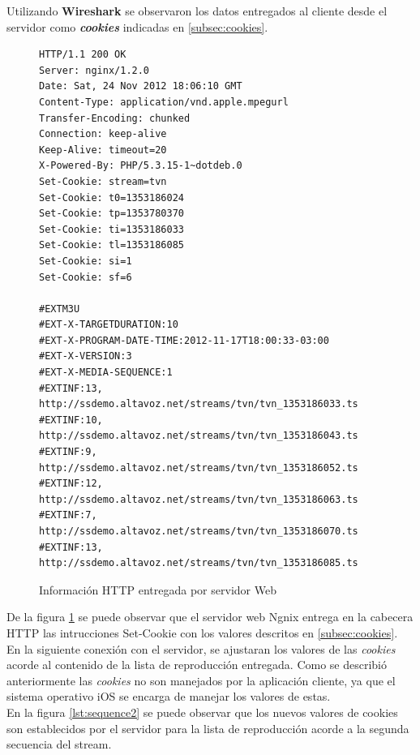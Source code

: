 Utilizando \textbf{Wireshark} se observaron los datos entregados al cliente desde el servidor como \textit{\textbf{cookies}} indicadas en \ref{subsec:cookies}.

\begin{figure}[H]
	\centering
\begin{lstlisting}
HTTP/1.1 200 OK
Server: nginx/1.2.0
Date: Sat, 24 Nov 2012 18:06:10 GMT
Content-Type: application/vnd.apple.mpegurl
Transfer-Encoding: chunked
Connection: keep-alive
Keep-Alive: timeout=20
X-Powered-By: PHP/5.3.15-1~dotdeb.0
Set-Cookie: stream=tvn
Set-Cookie: t0=1353186024
Set-Cookie: tp=1353780370
Set-Cookie: ti=1353186033
Set-Cookie: tl=1353186085
Set-Cookie: si=1
Set-Cookie: sf=6

#EXTM3U
#EXT-X-TARGETDURATION:10
#EXT-X-PROGRAM-DATE-TIME:2012-11-17T18:00:33-03:00
#EXT-X-VERSION:3
#EXT-X-MEDIA-SEQUENCE:1
#EXTINF:13,
http://ssdemo.altavoz.net/streams/tvn/tvn_1353186033.ts
#EXTINF:10,
http://ssdemo.altavoz.net/streams/tvn/tvn_1353186043.ts
#EXTINF:9,
http://ssdemo.altavoz.net/streams/tvn/tvn_1353186052.ts
#EXTINF:12,
http://ssdemo.altavoz.net/streams/tvn/tvn_1353186063.ts
#EXTINF:7,
http://ssdemo.altavoz.net/streams/tvn/tvn_1353186070.ts
#EXTINF:13,
http://ssdemo.altavoz.net/streams/tvn/tvn_1353186085.ts
\end{lstlisting}
\caption{Información HTTP entregada por servidor Web}
\label{lst:setcookies}
\end{figure}

De la figura \ref{lst:setcookies} se puede observar que el servidor web Ngnix\cite{bib:ngnix-homepage} entrega en la cabecera HTTP las intrucciones Set-Cookie con los valores descritos en \ref{subsec:cookies}. \\

En la siguiente conexión con el servidor, se ajustaran los valores de las \textit{cookies} acorde al contenido de la lista de reproducción entregada. Como se describió anteriormente las \textit{cookies} no son manejados por la aplicación cliente, ya que el sistema operativo iOS se encarga de manejar los valores de estas.\\

En la figura \ref{lst:sequence2} se puede observar que los nuevos valores de cookies son establecidos por el servidor para la lista de reproducción acorde a la segunda secuencia del stream.

